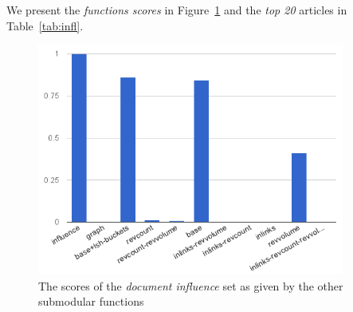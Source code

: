 We present the \emph{functions scores} in Figure~\ref{img:infl} and the
\emph{top 20} articles in Table~\ref{tab:infl}.

\begin{figure}
  \centering
  \includegraphics[width=0.9\textwidth,natwidth=555,natheight=419]{images/infl.png}
  \caption{The scores of the \emph{document influence} set as given by the
  other submodular functions}
  \label{img:infl}
\end{figure}

